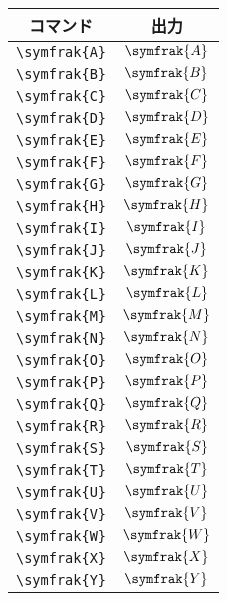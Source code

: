 \begin{figure}[htbp]
    \centering
    \begin{subfigure}{.5\textwidth}
        \centering
        \begin{tabular}{cc}
            \toprule
            コマンド           & 出力            \\
            \midrule
            \verb|\symfrak{A}| & \(\symfrak{A}\) \\
            \verb|\symfrak{B}| & \(\symfrak{B}\) \\
            \verb|\symfrak{C}| & \(\symfrak{C}\) \\
            \verb|\symfrak{D}| & \(\symfrak{D}\) \\
            \verb|\symfrak{E}| & \(\symfrak{E}\) \\
            \verb|\symfrak{F}| & \(\symfrak{F}\) \\
            \verb|\symfrak{G}| & \(\symfrak{G}\) \\
            \verb|\symfrak{H}| & \(\symfrak{H}\) \\
            \verb|\symfrak{I}| & \(\symfrak{I}\) \\
            \verb|\symfrak{J}| & \(\symfrak{J}\) \\
            \verb|\symfrak{K}| & \(\symfrak{K}\) \\
            \verb|\symfrak{L}| & \(\symfrak{L}\) \\
            \verb|\symfrak{M}| & \(\symfrak{M}\) \\
            \verb|\symfrak{N}| & \(\symfrak{N}\) \\
            \verb|\symfrak{O}| & \(\symfrak{O}\) \\
            \verb|\symfrak{P}| & \(\symfrak{P}\) \\
            \verb|\symfrak{Q}| & \(\symfrak{Q}\) \\
            \verb|\symfrak{R}| & \(\symfrak{R}\) \\
            \verb|\symfrak{S}| & \(\symfrak{S}\) \\
            \verb|\symfrak{T}| & \(\symfrak{T}\) \\
            \verb|\symfrak{U}| & \(\symfrak{U}\) \\
            \verb|\symfrak{V}| & \(\symfrak{V}\) \\
            \verb|\symfrak{W}| & \(\symfrak{W}\) \\
            \verb|\symfrak{X}| & \(\symfrak{X}\) \\
            \verb|\symfrak{Y}| & \(\symfrak{Y}\) \\

\end{tabular}
\end{subfigure}
\end{figure}
